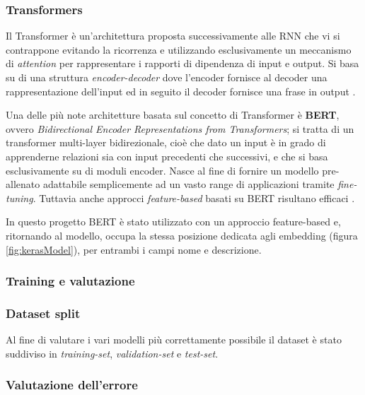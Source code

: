 \subsubsection{Transformers}
Il Transformer è un'architettura proposta successivamente alle RNN che vi si
contrappone evitando la ricorrenza e utilizzando esclusivamente un meccanismo di
\textit{attention} per rappresentare i rapporti di dipendenza di input e output.
Si basa su di una struttura \textit{encoder-decoder} dove l'encoder fornisce al
decoder una rappresentazione dell'input ed in seguito il decoder fornisce una
frase in output \cite{vaswani2017attention}.



Una delle più note architetture basata sul concetto di Transformer è
\textbf{BERT}, ovvero \textit{Bidirectional Encoder Representations from
Transformers}; si tratta di un transformer multi-layer bidirezionale, cioè 
che dato un input è in grado di apprenderne relazioni sia con input precedenti
che successivi, e che si basa esclusivamente su
di moduli encoder. Nasce al fine di fornire un modello
pre-allenato adattabile semplicemente ad un vasto range di applicazioni tramite
\textit{fine-tuning}. Tuttavia anche approcci \textit{feature-based} basati
su BERT risultano efficaci \cite{devlin2018bert}.

In questo progetto BERT è stato utilizzato con un approccio
feature-based e, ritornando al modello, occupa la stessa posizione dedicata
agli embedding (figura \ref{fig:kerasModel}), per entrambi i campi nome e descrizione.

\subsubsection{Training e valutazione}

\subsubsection{Dataset split}

Al fine di valutare i vari modelli più correttamente possibile il dataset è
stato suddiviso in \textit{training-set}, \textit{validation-set} e
\textit{test-set}.

\subsubsection{Valutazione dell'errore}

